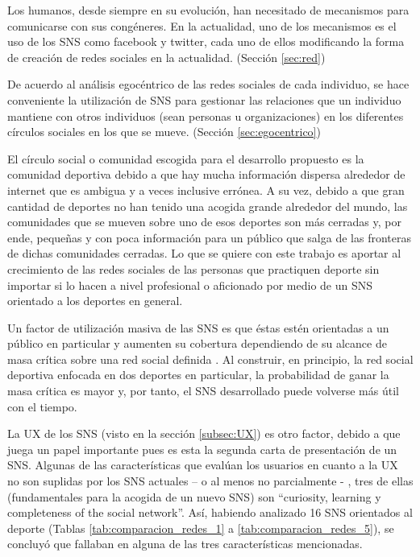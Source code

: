 Los humanos, desde siempre en su evolución, han necesitado de mecanismos para comunicarse con sus congéneres. En la actualidad, uno de los mecanismos es el uso de los SNS como facebook y twitter, cada uno de ellos modificando la forma de creación de redes sociales en la actualidad. (Sección \ref{sec:red})

De acuerdo al análisis egocéntrico de las redes sociales de cada individuo, se hace conveniente la utilización de SNS para gestionar las relaciones que un individuo mantiene con otros individuos (sean personas u organizaciones) en los diferentes círculos sociales en los que se mueve. (Sección \ref{sec:egocentrico})

El círculo social o comunidad escogida para el desarrollo propuesto es la comunidad deportiva debido a que hay mucha información dispersa alrededor de internet que es ambigua y a veces inclusive errónea. A su vez, debido a que gran cantidad de deportes no han tenido una acogida grande alrededor del mundo, las comunidades que se mueven sobre uno de esos deportes son más cerradas y, por ende, pequeñas y con poca información para un público que salga de las fronteras de dichas comunidades cerradas. Lo que se quiere con este trabajo es aportar al crecimiento de las redes sociales de las personas que practiquen deporte sin importar si lo hacen a nivel profesional o aficionado por medio de un SNS orientado a los deportes en general.

Un factor de utilización masiva de las SNS es que éstas estén orientadas a un público en particular y aumenten su cobertura dependiendo de su alcance de masa crítica sobre una red social definida \cite{sna_startups}. Al construir, en principio, la red social deportiva enfocada en dos deportes en particular, la probabilidad de ganar la masa crítica es mayor y, por tanto, el SNS desarrollado puede volverse más útil con el tiempo.

La UX de los SNS (visto en la sección \ref{subsec:UX}) es otro factor, debido a que juega un papel importante pues es esta la segunda carta de presentación de un SNS. Algunas de las características que evalúan los usuarios en cuanto a la UX no son suplidas por los SNS actuales – o al menos no parcialmente - , tres de ellas (fundamentales para la acogida de un nuevo SNS) son “curiosity, learning y completeness of the social network”. Así, habiendo analizado 16 SNS orientados al deporte (Tablas \ref{tab:comparacion_redes_1} a \ref{tab:comparacion_redes_5}), se concluyó que fallaban en alguna de las tres características mencionadas.

